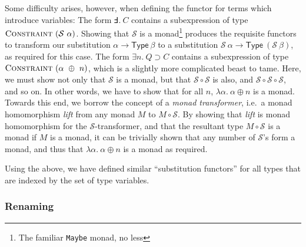 \documentclass[a4paper]{jfp}
\begin{document}
Some difficulty arises, however, when defining the functor for terms which introduce variables: The form $\Finv.\ C$ contains a subexpression of type
$\textsc{Constraint}\ (\mathcal{S}\ \alpha)$. Showing that $\mathcal{S}$ is a monad\footnote{The familiar \texttt{Maybe} monad, no less} produces the
requisite functors to transform our substitution $\alpha \rightarrow \textsf{Type}\ \beta$ to a substitution $\mathcal{S}\ \alpha \rightarrow
\textsf{Type}\ (\mathcal{S}\ \beta)$, as required for this case. The form $\exists n.\ Q \supset C$ contains a subexpression of type
$\textsc{Constraint}\ (\alpha\ \oplus\ n)$, which is a slightly more complicated beast to tame. Here, we must show not only that $\mathcal{S}$ is a monad, but that
$\mathcal{S} \circ \mathcal{S}$ is also, and $\mathcal{S} \circ \mathcal{S} \circ \mathcal{S}$, and so on. In other words, we have to show that for all
$n$, $\lambda \alpha.\ \alpha \oplus n$ is a monad.  Towards this end, we borrow the concept of a \emph{monad transformer}, i.e.\ a monad homomorphism \emph{lift} from
any monad $M$ to $M \circ \mathcal{S}$. By showing that \emph{lift} is monad homomorphism for the $\mathcal{S}$-transformer, and that the resultant type
$M \circ \mathcal{S}$ is a monad if $M$ is a monad, it can be trivially shown that any number of $\mathcal{S}$'s form a monad, and
thus that $\lambda \alpha.\ \alpha \oplus n$ is a monad as required.                                                                

Using the above, we have defined similar ``substitution functors'' for all types that are indexed by the set of type variables.

\subsubsection{Renaming}
\end{document}
